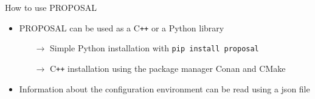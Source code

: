 \documentclass[t]{beamer}
\newlength{\itemseparation}
\begin{document}
  \begin{columns}[onlytextwidth]%
    \begin{column}{0.6\textwidth}%
      \begin{block}[equal height group=F]{How to use PROPOSAL}%
        \begin{itemize}
          \setlength\itemsep{\itemseparation}
          \item PROPOSAL can be used as a C\texttt{++} or a Python library
            \begin{itemize}
              \setlength\itemsep{\itemseparation}
              \item[$\rightarrow$] Simple Python installation with \colorbox{tuYellow}{\texttt{pip install proposal}}
              \item[$\rightarrow$] C\texttt{++} installation using the package manager Conan and CMake
            \end{itemize}
          \item Information about the configuration environment can be read using a json file
        \end{itemize}

        \begin{columns}[onlytextwidth]
        \begin{column}{0.45\textwidth}
        \begin{mdframed}[backgroundcolor=light-gray, roundcorner=10pt,leftmargin=1, rightmargin=1, innerleftmargin=15, innertopmargin=15,innerbottommargin=15, outerlinewidth=1, linecolor=light-gray]

          
          \end{mdframed} 


\end{column}
\end{columns}
\end{block}
\end{column}
\end{columns}
\end{document}
